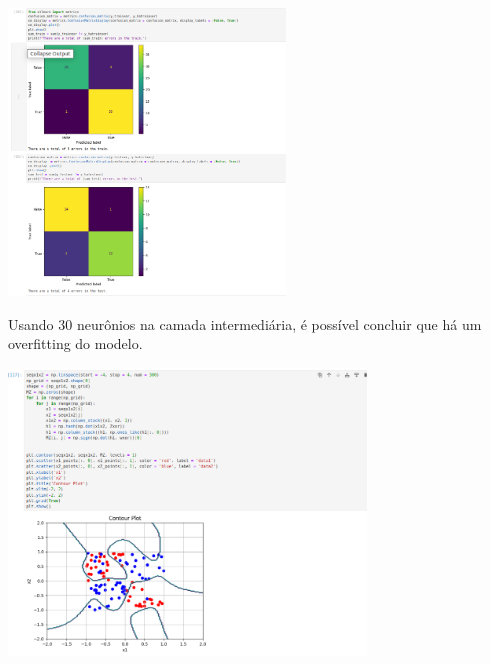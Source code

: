 \documentclass{article}
\begin{document}
\begin{center}

\includegraphics[height=3in]{exercise_pic/xor/conf_matrix_10_xor.png}
\vspace{10pt}
    
\end{center}
Usando 30 neurônios na camada intermediária, é possível concluir que há um overfitting do modelo.

\begin{center}

\includegraphics[height=3in]{exercise_pic/xor/plot_graph_xor_30.png}
\vspace{10pt}

\end{center}
\end{document}
